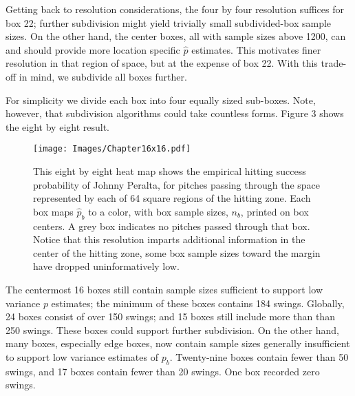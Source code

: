 Getting back to resolution considerations, the four by four resolution suffices for box 22; further subdivision might yield trivially small subdivided-box sample sizes. On the other hand, the center boxes, all with sample sizes above 1200, can and should provide more location specific $\hat{p}$ estimates. This motivates finer resolution in that region of space, but at the expense of box 22. With this trade-off in mind, we subdivide all boxes further. 

For simplicity we divide each box into four equally sized sub-boxes. Note, however, that subdivision algorithms could take countless forms. Figure 3 shows the eight by eight result.
        \begin{figure}[H]
      	\centering
      	\texttt{[image: Images/Chapter16x16.pdf]} 
      	\caption{This eight by eight heat map shows the empirical hitting success probability of Johnny Peralta, for pitches passing through the space represented by each of 64 square regions of the hitting zone. Each box maps $\hat{p}_{b}$ to a color, with box sample sizes, $n_{b}$, printed on box centers. A grey box indicates no pitches passed through that box. Notice that this resolution imparts additional information in the center of the hitting zone, some box sample sizes toward the margin have dropped uninformatively low.}
      	\end{figure} 

The centermost 16 boxes still contain sample sizes sufficient to support low variance $p$ estimates; the minimum of these boxes contains 184 swings. Globally, 24 boxes consist of over 150 swings; and 15 boxes still include more than than 250 swings. These boxes could support further subdivision. On the other hand, many boxes, especially edge boxes, now contain sample sizes generally insufficient to support low variance estimates of $p_{b}$. Twenty-nine boxes contain fewer than 50 swings, and 17 boxes contain fewer than 20 swings. One box recorded zero swings.

